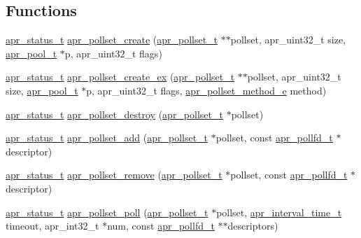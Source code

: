 \subsection*{Functions}
\begin{DoxyCompactItemize}
\item 
\hyperlink{group__apr__errno_gaf76ee4543247e9fb3f3546203e590a6c}{apr\+\_\+status\+\_\+t} \hyperlink{group__apr__poll_ga4ca4056a19daee8fe94ddba100fe2326}{apr\+\_\+pollset\+\_\+create} (\hyperlink{group__apr__poll_ga680da1f10ac5ef75efc503a9d15b8906}{apr\+\_\+pollset\+\_\+t} $\ast$$\ast$pollset, apr\+\_\+uint32\+\_\+t size, \hyperlink{group__apr__pools_gaf137f28edcf9a086cd6bc36c20d7cdfb}{apr\+\_\+pool\+\_\+t} $\ast$p, apr\+\_\+uint32\+\_\+t flags)
\item 
\hyperlink{group__apr__errno_gaf76ee4543247e9fb3f3546203e590a6c}{apr\+\_\+status\+\_\+t} \hyperlink{group__apr__poll_ga9448a2d756868aa1c6dbc9726a2e32b5}{apr\+\_\+pollset\+\_\+create\+\_\+ex} (\hyperlink{group__apr__poll_ga680da1f10ac5ef75efc503a9d15b8906}{apr\+\_\+pollset\+\_\+t} $\ast$$\ast$pollset, apr\+\_\+uint32\+\_\+t size, \hyperlink{group__apr__pools_gaf137f28edcf9a086cd6bc36c20d7cdfb}{apr\+\_\+pool\+\_\+t} $\ast$p, apr\+\_\+uint32\+\_\+t flags, \hyperlink{group__apr__poll_gabe6f1238ea45e9425fa052e2788e4a29}{apr\+\_\+pollset\+\_\+method\+\_\+e} method)
\item 
\hyperlink{group__apr__errno_gaf76ee4543247e9fb3f3546203e590a6c}{apr\+\_\+status\+\_\+t} \hyperlink{group__apr__poll_gaa06c538d3fea9d860374043aff9450b2}{apr\+\_\+pollset\+\_\+destroy} (\hyperlink{group__apr__poll_ga680da1f10ac5ef75efc503a9d15b8906}{apr\+\_\+pollset\+\_\+t} $\ast$pollset)
\item 
\hyperlink{group__apr__errno_gaf76ee4543247e9fb3f3546203e590a6c}{apr\+\_\+status\+\_\+t} \hyperlink{group__apr__poll_ga4ec50bf9a11c6b60927c51b81412f5b9}{apr\+\_\+pollset\+\_\+add} (\hyperlink{group__apr__poll_ga680da1f10ac5ef75efc503a9d15b8906}{apr\+\_\+pollset\+\_\+t} $\ast$pollset, const \hyperlink{structapr__pollfd__t}{apr\+\_\+pollfd\+\_\+t} $\ast$descriptor)
\item 
\hyperlink{group__apr__errno_gaf76ee4543247e9fb3f3546203e590a6c}{apr\+\_\+status\+\_\+t} \hyperlink{group__apr__poll_ga3c99c06e142d6b6b789eeb6086122e3a}{apr\+\_\+pollset\+\_\+remove} (\hyperlink{group__apr__poll_ga680da1f10ac5ef75efc503a9d15b8906}{apr\+\_\+pollset\+\_\+t} $\ast$pollset, const \hyperlink{structapr__pollfd__t}{apr\+\_\+pollfd\+\_\+t} $\ast$descriptor)
\item 
\hyperlink{group__apr__errno_gaf76ee4543247e9fb3f3546203e590a6c}{apr\+\_\+status\+\_\+t} \hyperlink{group__apr__poll_ga6b31d7b3a7b2d356370403dd2b79ecf3}{apr\+\_\+pollset\+\_\+poll} (\hyperlink{group__apr__poll_ga680da1f10ac5ef75efc503a9d15b8906}{apr\+\_\+pollset\+\_\+t} $\ast$pollset, \hyperlink{group__apr__time_gaae2129185a395cc393f76fabf4f43e47}{apr\+\_\+interval\+\_\+time\+\_\+t} timeout, apr\+\_\+int32\+\_\+t $\ast$num, const \hyperlink{structapr__pollfd__t}{apr\+\_\+pollfd\+\_\+t} $\ast$$\ast$descriptors)
$$
\end{DoxyCompactItemize}
